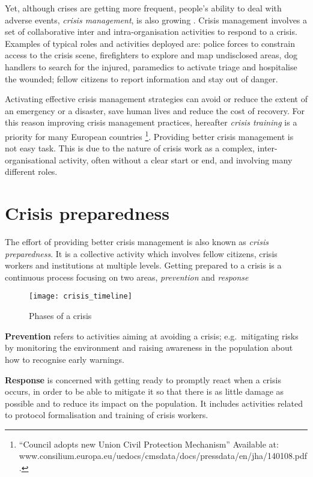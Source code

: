 Yet, although crises are getting more frequent, people's ability to deal with adverse events, \emph{crisis management}, is also growing \autocite{Boin:2009bv}. Crisis management involves a set of collaborative inter and intra-organisation activities to respond to a crisis. Examples of typical roles and activities deployed are: police forces to constrain access to the crisis scene, firefighters to explore and map undisclosed areas, dog handlers to search for the injured, paramedics to activate triage and hospitalise the wounded; fellow citizens to report information and stay out of danger.

Activating effective crisis management strategies can avoid or reduce the extent of an emergency or a disaster, save human lives and reduce the cost of recovery. For this reason improving crisis management practices, hereafter \emph{crisis training} is a priority for many European countries \footnote{``Council adopts new Union Civil Protection Mechanism'' Available at: www.consilium.europa.eu/uedocs/cmsdata/docs/pressdata/en/jha/140108.pdf.}. Providing better crisis management is not easy task. This is due to the nature of crisis work as a complex, inter-organisational activity, often without a clear start or end, and involving many different roles.

\section{Crisis preparedness}\label{crisis-preparedness}

The effort of providing better crisis management is also known as \emph{crisis preparedness}. It is a collective activity which involves fellow citizens, crisis workers and institutions at multiple levels. Getting prepared to a crisis is a continuous process focusing on two areas, \emph{prevention} and \emph{response} \autocite{Deverell:2009fk}

\begin{figure}
	[h!] \centering 
	\texttt{[image: crisis\_timeline]} \caption{Phases of a crisis} \label{fig:phases} 
\end{figure}

\textbf{Prevention} refers to activities aiming at avoiding a crisis; e.g.~mitigating risks by monitoring the environment and raising awareness in the population about how to recognise early warnings.

\textbf{Response} is concerned with getting ready to promptly react when a crisis occurs, in order to be able to mitigate it so that there is as little damage as possible and to reduce its impact on the population. It includes activities related to protocol formalisation and training of crisis workers.

